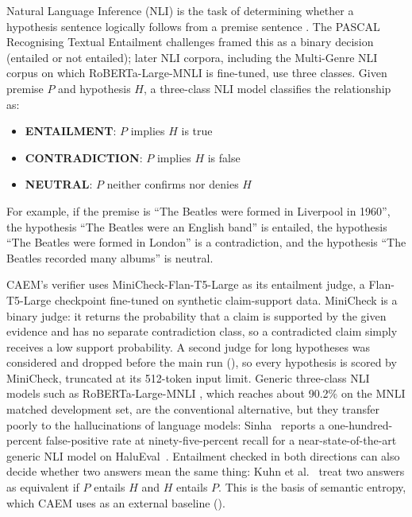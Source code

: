 Natural Language Inference (NLI) is the task of determining whether a hypothesis sentence logically follows from a premise sentence \cite{barhaim2006second}. The PASCAL Recognising Textual Entailment challenges framed this as a binary decision (entailed or not entailed); later NLI corpora, including the Multi-Genre NLI corpus on which RoBERTa-Large-MNLI is fine-tuned, use three classes. Given premise $P$ and hypothesis $H$, a three-class NLI model classifies the relationship as:
\begin{itemize}
    \item \textbf{ENTAILMENT}: $P$ implies $H$ is true
    \item \textbf{CONTRADICTION}: $P$ implies $H$ is false  
    \item \textbf{NEUTRAL}: $P$ neither confirms nor denies $H$
\end{itemize}

For example, if the premise is ``The Beatles were formed in Liverpool in 1960'', the hypothesis ``The Beatles were an English band'' is entailed, the hypothesis ``The Beatles were formed in London'' is a contradiction, and the hypothesis ``The Beatles recorded many albums'' is neutral.

CAEM's verifier uses MiniCheck-Flan-T5-Large \cite{tang2024minicheck} as its entailment judge, a Flan-T5-Large checkpoint fine-tuned on synthetic claim-support data. MiniCheck is a binary judge: it returns the probability that a claim is supported by the given evidence and has no separate contradiction class, so a contradicted claim simply receives a low support probability. A second judge for long hypotheses was considered and dropped before the main run (), so every hypothesis is scored by MiniCheck, truncated at its 512-token input limit. Generic three-class NLI models such as RoBERTa-Large-MNLI \cite{liu2019roberta}, which reaches about 90.2\% on the MNLI matched development set, are the conventional alternative, but they transfer poorly to the hallucinations of language models: Sinha~\cite{sinha2025semantic} reports a one-hundred-percent false-positive rate at ninety-five-percent recall for a near-state-of-the-art generic NLI model on HaluEval~\cite{li-etal-2023-halueval}. Entailment checked in both directions can also decide whether two answers mean the same thing: Kuhn et al.~\cite{kuhn2023semantic} treat two answers as equivalent if $P$ entails $H$ and $H$ entails $P$. This is the basis of semantic entropy, which CAEM uses as an external baseline ().

